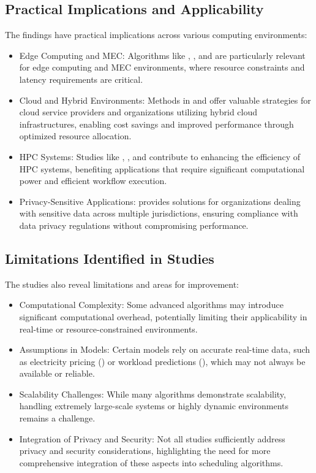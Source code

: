 \documentclass[a4paper, final]{article}
\begin{document}
\subsection{Practical Implications and Applicability}
The findings have practical implications across various computing environments:
\begin{itemize}
    \item Edge Computing and MEC: Algorithms like \cite{bib:2_faro}, \cite{bib:3_sandcat}, and \cite{bib:6_marine} are particularly 
    relevant for edge computing and MEC environments, where resource constraints and latency requirements are critical.

    \item Cloud and Hybrid Environments: Methods in \cite{bib:5_epee} and \cite{bib:9} offer valuable strategies for cloud 
    service providers and organizations utilizing hybrid cloud infrastructures, enabling cost savings and 
    improved performance through optimized resource allocation.
    
    \item HPC Systems: Studies like \cite{bib:1_acrl}, \cite{bib:8}, and \cite{bib:10} contribute to enhancing the 
    efficiency of HPC systems, benefiting applications that require significant computational power and efficient workflow execution.
    
    \item Privacy-Sensitive Applications: \cite{bib:7_ppps} provides solutions for organizations dealing with sensitive 
    data across multiple jurisdictions, ensuring compliance with data privacy regulations without compromising performance.
\end{itemize}

\subsection{Limitations Identified in Studies}
The studies also reveal limitations and areas for improvement:
\begin{itemize}
    \item Computational Complexity: Some advanced algorithms may introduce significant computational 
    overhead, potentially limiting their applicability in real-time or resource-constrained environments.

    \item Assumptions in Models: Certain models rely on accurate real-time data, such as electricity pricing 
    (\cite{bib:5_epee}) or workload predictions (\cite{bib:6_marine}), which may not always be available or reliable.
    
    \item Scalability Challenges: While many algorithms demonstrate scalability, handling extremely large-scale 
    systems or highly dynamic environments remains a challenge.
    
    \item Integration of Privacy and Security: Not all studies sufficiently address privacy and security 
    considerations, highlighting the need for more comprehensive integration of these aspects into scheduling algorithms.
\end{itemize}
\end{document}

